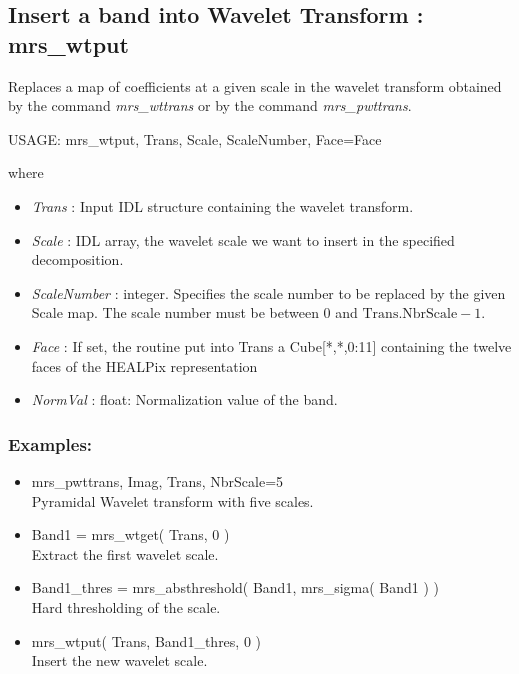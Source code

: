 \subsection{Insert a band into  Wavelet Transform : mrs\_wtput}
Replaces a map of coefficients at a given scale in the wavelet transform obtained by the command {\em mrs\_wttrans} or by the command {\em mrs\_pwttrans}.
 {\bf
\begin{center}
     USAGE:  mrs\_wtput, Trans, Scale, ScaleNumber, Face=Face 
\end{center}}
where 
\begin{itemize}
\item {\em Trans} : Input IDL structure containing the wavelet transform. 
\item {\em Scale} : IDL array, the wavelet scale we want to insert in the specified decomposition.
\item {\em ScaleNumber} : integer. Specifies the scale number to be replaced by the given Scale map. The scale number must be between 0 and $\textrm{Trans.NbrScale}-1$.
\item {\em Face} : If set, the routine put into Trans a Cube[*,*,0:11] containing the twelve faces of the HEALPix representation
\item {\em NormVal} : float: Normalization value of the band. 
\end{itemize}

\subsubsection*{Examples:} 
\begin{itemize}
\item mrs\_pwttrans, Imag, Trans, NbrScale=5 \\
Pyramidal Wavelet transform with five scales.
\item Band1 = mrs\_wtget( Trans, 0 ) \\
Extract the first wavelet scale.
\item Band1\_thres = mrs\_absthreshold( Band1, mrs\_sigma( Band1 ) ) \\
Hard thresholding of the scale.
\item mrs\_wtput( Trans, Band1\_thres, 0 ) \\
Insert the new wavelet scale.
\end{itemize}



